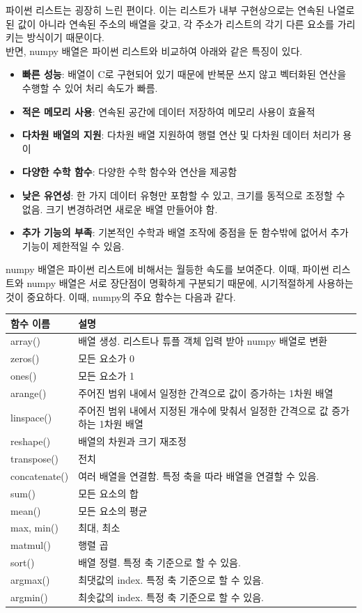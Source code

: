 파이썬 리스트는 굉장히 느린 편이다. 이는 리스트가 내부 구현상으로는 연속된 나열로 된 값이 아니라 연속된 주소의 배열을 갖고, 각 주소가 리스트의 각기 다른 요소를 가리키는 방식이기 때문이다.\\
반면, numpy 배열은 파이썬 리스트와 비교하여 아래와 같은 특징이 있다.
\begin{itemize}
\item \textbf{빠른 성능}: 배열이 C로 구현되어 있기 때문에 반복문 쓰지 않고 벡터화된 연산을 수행할 수 있어 처리 속도가 빠름.
\item \textbf{적은 메모리 사용}: 연속된 공간에 데이터 저장하여 메모리 사용이 효율적
\item \textbf{다차원 배열의 지원}: 다차원 배열 지원하여 행렬 연산 및 다차원 데이터 처리가 용이
\item \textbf{다양한 수학 함수}: 다양한 수학 함수와 연산을 제공함
\item \textbf{낮은 유연성}: 한 가지 데이터 유형만 포함할 수 있고, 크기를 동적으로 조정할 수 없음. 크기 변경하려면 새로운 배열 만들어야 함.
\item \textbf{추가 기능의 부족}: 기본적인 수학과 배열 조작에 중점을 둔 함수밖에 없어서 추가 기능이 제한적일 수 있음.
\end{itemize}

numpy 배열은 파이썬 리스트에 비해서는 월등한 속도를 보여준다. 이때, 파이썬 리스트와 numpy 배열은 서로 장단점이 명확하게 구분되기 때문에, 시기적절하게 사용하는 것이 중요하다. 이때, numpy의 주요 함수는 다음과 같다.

\begin{longtable}{p{4cm}p{10cm}}
\toprule
함수 이름 & 설명\\
\midrule
array() & 배열 생성. 리스트나 튜플 객체 입력 받아 numpy 배열로 변환 \\
zeros() & 모든 요소가 0 \\
ones() & 모든 요소가 1 \\
arange() & 주어진 범위 내에서 일정한 간격으로 값이 증가하는 1차원 배열 \\
linspace() & 주어진 범위 내에서 지정된 개수에 맞춰서 일정한 간격으로 값 증가하는 1차원 배열 \\
reshape() & 배열의 차원과 크기 재조정 \\
transpose() & 전치 \\
concatenate() & 여러 배열을 연결함. 특정 축을 따라 배열을 연결할 수 있음. \\
sum() & 모든 요소의 합 \\
mean() & 모든 요소의 평균 \\
max, min() & 최대, 최소 \\
matmul() & 행렬 곱 \\
sort() & 배열 정렬. 특정 축 기준으로 할 수 있음. \\
argmax() & 최댓값의 index. 특정 축 기준으로 할 수 있음. \\
argmin() & 최솟값의 index. 특정 축 기준으로 할 수 있음. \\
\bottomrule
\end{longtable}

